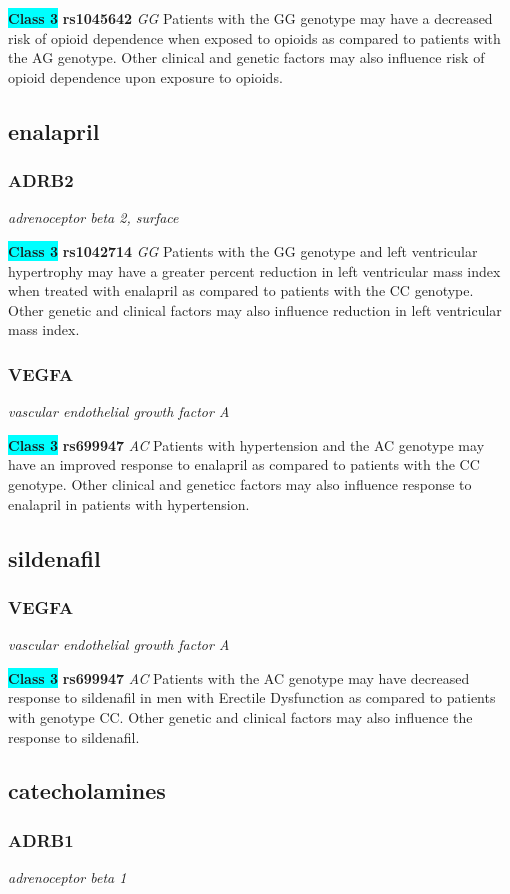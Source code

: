 \documentclass{report}
\begin{document}
\textbf{\colorbox{cyan} {Class 3}} \textbf{ rs1045642 } \textit{ GG }
Patients with the GG genotype may have a decreased risk of opioid dependence when exposed to opioids as compared to patients with the AG genotype. Other clinical and genetic factors may also influence risk of opioid dependence upon exposure to opioids. \newline\subsection{ enalapril }\subsubsection{ ADRB2 }
\textit{ adrenoceptor beta 2, surface }

\textbf{\colorbox{cyan} {Class 3}} \textbf{ rs1042714 } \textit{ GG }
Patients with the GG genotype and left ventricular hypertrophy may have a greater percent reduction in left ventricular mass index when treated with enalapril as compared to patients with the CC genotype. Other genetic and clinical factors may also influence reduction in left ventricular mass index. \newline\subsubsection{ VEGFA }
\textit{ vascular endothelial growth factor A }

\textbf{\colorbox{cyan} {Class 3}} \textbf{ rs699947 } \textit{ AC }
Patients with hypertension and the AC genotype may have an improved response to enalapril as compared to patients with the CC genotype. Other clinical and geneticc factors may also influence response to enalapril in patients with hypertension. \newline\subsection{ sildenafil }\subsubsection{ VEGFA }
\textit{ vascular endothelial growth factor A }

\textbf{\colorbox{cyan} {Class 3}} \textbf{ rs699947 } \textit{ AC }
Patients with the AC genotype may have decreased response to sildenafil in men with Erectile Dysfunction as compared to patients with genotype CC. Other genetic and clinical factors may also influence the response to sildenafil.\newline\subsection{ catecholamines }\subsubsection{ ADRB1 }
\textit{ adrenoceptor beta 1 }
\end{document}
